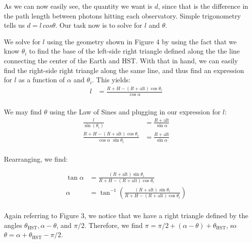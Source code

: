 \documentclass[12pt]{article}
\begin{document}
\begin{onehalfspacing}
As we can now easily see, the quantity we want is $d$, since that is the difference in the path length between photons hitting each observatory. Simple trigonometry tells us $d = l \, cos{\theta}$. Our task now is to solve for $l$ and $\theta$.

\bigskip
\bigskip


\begin{figure}

\end{figure}

We solve for $l$ using the geometry shown in Figure 4 by using the fact that we know $\theta_i$ to find the base of the left-side right triangle defined along the the line connecting the center of the Earth and HST. With that in hand, we can easily find the right-side right triangle along the same line, and thus find an expression for $l$ as a function of $\alpha$ and $\theta_i$. This yields:
\begin{align*}
  l &= \frac{R + H - (R + \text{alt}) \cos \theta_i}{\cos \alpha} \\
\end{align*}

We may find $\theta$ using the Law of Sines and plugging in our expression for $l$:
\begin{align*}
  \frac{l}{\sin(\theta_i)} &= \frac{R + \text{alt}}{\sin \alpha} \\
  \frac{R + H - (R + \text{alt}) \cos{\theta_i}}{\cos \alpha \,\, \sin \theta_i} &= \frac{R + \text{alt}}{\sin \alpha} \\
\end{align*}

Rearranging, we find:

\begin{align*}
  \tan \alpha &= \frac{ (R + \text{alt}) \sin \theta_i}{R + H - (R + \text{alt}) \cos \theta_i} \\
  \alpha &= \tan^{-1} \left( \frac{ (R + \text{alt}) \sin \theta_i}{R + H - (R + \text{alt}) \cos \theta_i} \right) \\
\end{align*}

Again referring to Figure 3, we notice that we have a right triangle defined by the angles $\theta_{\text{HST}}, \alpha - \theta$, and $\pi/2$. Therefore, we find $\pi = \pi/2 + (\alpha - \theta) + \theta_{\text{HST}}$, so $\theta = \alpha + \theta_{\text{HST}} - \pi/2$.



\end{onehalfspacing}
\end{document}
